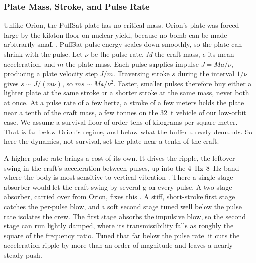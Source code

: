 \documentclass{article}
\begin{document}
\subsubsection{Plate Mass, Stroke, and Pulse Rate}\label{sec:pusher_plate_mass_stroke}
Unlike Orion, the PuffSat plate has no critical mass. Orion's plate was forced large by the kiloton floor on nuclear yield, because no bomb can be made arbitrarily small \cite{balcomb1970nuclear}. PuffSat pulse energy scales down smoothly, so the plate can shrink with the pulse. Let $\nu$ be the pulse rate, $M$ the craft mass, $a$ its mean acceleration, and $m$ the plate mass. Each pulse supplies impulse $J=Ma/\nu$, producing a plate velocity step $J/m$. Traversing stroke $s$ during the interval $1/\nu$ gives $s\sim J/(m\nu)$, so $ms\sim Ma/\nu^2$. Faster, smaller pulses therefore buy either a lighter plate at the same stroke or a shorter stroke at the same mass, never both at once. At a pulse rate of a few hertz, a stroke of a few meters holds the plate near a tenth of the craft mass, a few tonnes on the \SI{32}{\tonne} vehicle of our low-orbit case. We assume a survival floor of order tens of kilograms per square meter. That is far below Orion's regime, and below what the buffer already demands. So here the dynamics, not survival, set the plate near a tenth of the craft.

A higher pulse rate brings a cost of its own. It drives the ripple, the leftover swing in the craft's acceleration between pulses, up into the \SIrange{4}{8}{\hertz} band where the body is most sensitive to vertical vibration \cite{iso2631}. There a single-stage absorber would let the craft swing by several g on every pulse. A two-stage absorber, carried over from Orion, fixes this \cite{projorion}. A stiff, short-stroke first stage catches the per-pulse blow, and a soft second stage tuned well below the pulse rate isolates the crew. The first stage absorbs the impulsive blow, so the second stage can run lightly damped, where its transmissibility falls as roughly the square of the frequency ratio. Tuned that far below the pulse rate, it cuts the acceleration ripple by more than an order of magnitude and leaves a nearly steady push.
\end{document}
